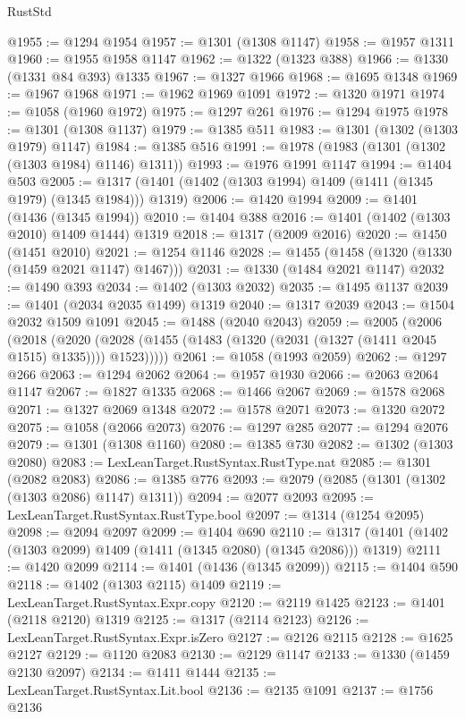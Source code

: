\begin{lexlean}{RustStd}
\begin{coremodule}
@1955 := @1294 @1954
@1957 := @1301 (@1308 @1147)
@1958 := @1957 @1311
@1960 := @1955 @1958 @1147
@1962 := @1322 (@1323 @388)
@1966 := @1330 (@1331 @84 @393) @1335
@1967 := @1327 @1966
@1968 := @1695 @1348
@1969 := @1967 @1968
@1971 := @1962 @1969 @1091
@1972 := @1320 @1971
@1974 := @1058 (@1960 @1972)
@1975 := @1297 @261
@1976 := @1294 @1975
@1978 := @1301 (@1308 @1137)
@1979 := @1385 @511
@1983 := @1301 (@1302 (@1303 @1979) @1147)
@1984 := @1385 @516
@1991 := @1978 (@1983 (@1301 (@1302 (@1303 @1984) @1146) @1311))
@1993 := @1976 @1991 @1147
@1994 := @1404 @503
@2005 := @1317 (@1401 (@1402 (@1303 @1994) @1409 (@1411 (@1345 @1979) (@1345 @1984))) @1319)
@2006 := @1420 @1994
@2009 := @1401 (@1436 (@1345 @1994))
@2010 := @1404 @388
@2016 := @1401 (@1402 (@1303 @2010) @1409 @1444) @1319
@2018 := @1317 (@2009 @2016)
@2020 := @1450 (@1451 @2010)
@2021 := @1254 @1146
@2028 := @1455 (@1458 (@1320 (@1330 (@1459 @2021 @1147) @1467)))
@2031 := @1330 (@1484 @2021 @1147)
@2032 := @1490 @393
@2034 := @1402 (@1303 @2032)
@2035 := @1495 @1137
@2039 := @1401 (@2034 @2035 @1499) @1319
@2040 := @1317 @2039
@2043 := @1504 @2032 @1509 @1091
@2045 := @1488 (@2040 @2043)
@2059 := @2005
    (@2006
      (@2018
        (@2020 (@2028 (@1455 (@1483 (@1320 (@2031 (@1327 (@1411 @2045 @1515) @1335)))) @1523)))))
@2061 := @1058 (@1993 @2059)
@2062 := @1297 @266
@2063 := @1294 @2062
@2064 := @1957 @1930
@2066 := @2063 @2064 @1147
@2067 := @1827 @1335
@2068 := @1466 @2067
@2069 := @1578 @2068
@2071 := @1327 @2069 @1348
@2072 := @1578 @2071
@2073 := @1320 @2072
@2075 := @1058 (@2066 @2073)
@2076 := @1297 @285
@2077 := @1294 @2076
@2079 := @1301 (@1308 @1160)
@2080 := @1385 @730
@2082 := @1302 (@1303 @2080)
@2083 := LexLeanTarget.RustSyntax.RustType.nat
@2085 := @1301 (@2082 @2083)
@2086 := @1385 @776
@2093 := @2079 (@2085 (@1301 (@1302 (@1303 @2086) @1147) @1311))
@2094 := @2077 @2093
@2095 := LexLeanTarget.RustSyntax.RustType.bool
@2097 := @1314 (@1254 @2095)
@2098 := @2094 @2097
@2099 := @1404 @690
@2110 := @1317 (@1401 (@1402 (@1303 @2099) @1409 (@1411 (@1345 @2080) (@1345 @2086))) @1319)
@2111 := @1420 @2099
@2114 := @1401 (@1436 (@1345 @2099))
@2115 := @1404 @590
@2118 := @1402 (@1303 @2115) @1409
@2119 := LexLeanTarget.RustSyntax.Expr.copy
@2120 := @2119 @1425
@2123 := @1401 (@2118 @2120) @1319
@2125 := @1317 (@2114 @2123)
@2126 := LexLeanTarget.RustSyntax.Expr.isZero
@2127 := @2126 @2115
@2128 := @1625 @2127
@2129 := @1120 @2083
@2130 := @2129 @1147
@2133 := @1330 (@1459 @2130 @2097)
@2134 := @1411 @1444
@2135 := LexLeanTarget.RustSyntax.Lit.bool
@2136 := @2135 @1091
@2137 := @1756 @2136

\end{coremodule}
\end{lexlean}
